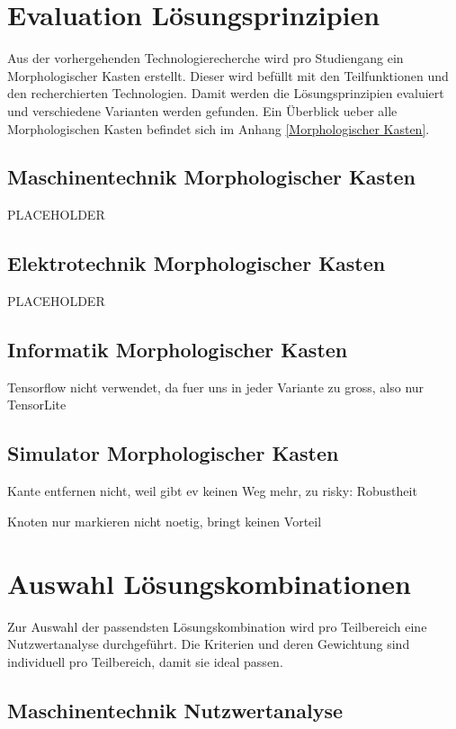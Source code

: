 \section{Evaluation Lösungsprinzipien}

Aus der vorhergehenden Technologierecherche wird pro Studiengang ein Morphologischer Kasten erstellt. Dieser wird befüllt mit den Teilfunktionen und den recherchierten Technologien. Damit werden die Lösungsprinzipien evaluiert und verschiedene Varianten werden gefunden. Ein Überblick ueber alle Morphologischen Kasten befindet sich im Anhang \ref{Morphologischer Kasten}.

\subsection{Maschinentechnik Morphologischer Kasten}

PLACEHOLDER

\subsection{Elektrotechnik Morphologischer Kasten}

PLACEHOLDER

\subsection{Informatik Morphologischer Kasten}

Tensorflow nicht verwendet, da fuer uns in jeder Variante zu gross, also nur TensorLite

\subsection{Simulator Morphologischer Kasten}

Kante entfernen nicht, weil gibt ev keinen Weg mehr, zu risky: Robustheit

Knoten nur markieren nicht noetig, bringt keinen Vorteil


\newpage
\section{Auswahl Lösungskombinationen}

Zur Auswahl der passendsten Lösungskombination wird pro Teilbereich eine Nutzwertanalyse durchgeführt. Die Kriterien und deren Gewichtung sind individuell pro Teilbereich, damit sie ideal passen.

\subsection{Maschinentechnik Nutzwertanalyse}

